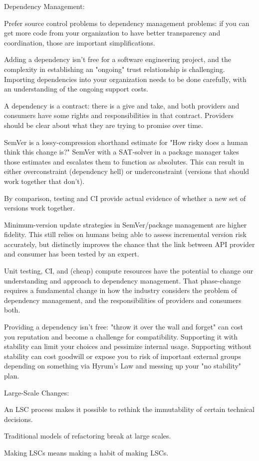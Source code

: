 Dependency Management:
\bit
\item Prefer source control problems to dependency management problems: if you can get more code from your organization
to have better transparency and coordination, those are important simplifications.
\item Adding a dependency isn't free for a software engineering project, and the complexity in establishing an "ongoing"
trust relationship is challenging. Importing dependencies into your organization needs to be done carefully, with an
understanding of the ongoing support costs.
\item A dependency is a contract: there is a give and take, and both providers and consumers have some rights and
responsibilities in that contract. Providers should be clear about what they are trying to promise over time.
\item SemVer is a lossy-compression shorthand estimate for "How risky does a human think this change is?" SemVer with a
SAT-solver in a package manager takes those estimates and escalates them to function as absolutes. This can result in
either overconstraint (dependency hell) or underconstraint (versions that should work together that don't).
\item By comparison, testing and CI provide actual evidence of whether a new set of versions work together.
\item Minimum-version update strategies in SemVer/package management are higher fidelity. This still relies on humans
being able to assess incremental version risk accurately, but distinctly improves the chance that the link between API
provider and consumer has been tested by an expert.
\item Unit testing, CI, and (cheap) compute resources have the potential to change our understanding and approach to
dependency management. That phase-change requires a fundamental change in how the industry considers the problem of
dependency management, and the responsibilities of providers and consumers both.
\item Providing a dependency isn't free: "throw it over the wall and forget" can cost you reputation and become a
challenge for compatibility. Supporting it with stability can limit your choices and pessimize internal usage.
Supporting without stability can cost goodwill or expose you to risk of important external groups depending on something
via Hyrum's Law and messing up your "no stability" plan.
\eit

Large-Scale Changes:
\bit
\item An LSC process makes it possible to rethink the immutability of certain technical decisions.
\item Traditional models of refactoring break at large scales.
\item Making LSCs means making a habit of making LSCs.
\eit

